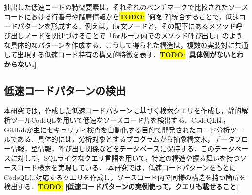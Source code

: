 \documentclass[submit,techrep,noauthor]{ipsj}
\newcommand{\todo}[1]{\colorbox{yellow}{{\bf TODO}:}{\color{red} {\textbf{[#1]}}}}
\begin{document}


抽出した低速コードの特徴要素は，それぞれのベンチマークで比較されたソースコードにおける行番号や階層情報から\todo{何を？}統合することで，低速コードパターンを形成する．例えば，for文ノードと，その配下にあるメソッド呼び出しノードを関連づけることで「forループ内でのメソッド呼び出し」のような具体的なパターンを作成する．こうして得られた構造は，複数の実装対に共通して出現する低速コード特有の構文的特徴を表す．\todo{具体例がないとわからない．}

\subsection{低速コードパターンの検出}

本研究では，作成した低速コードパターンに基づく検索クエリを作成し，静的解析ツールCodeQL\cite{ql}を用いて低速なソースコード片を検出する．CodeQLは，GitHubが主にセキュリティ検査を自動化する目的で開発されたコード分析ツールである．具体的には，分析対象とするプログラムから抽象構文木，データフロー情報，型情報，呼び出し関係などをデータベースに保持する．このデータベースに対して，SQLライクなクエリ言語を用いて，特定の構造や振る舞いを持つソースコード検索を実現している．
本研究では，低速コードパターンをもとにCodeQLに対応するクエリを作成し，ソースコード内で同様の構造を持つ箇所を検出する．\todo{低速コードパターンの実例使って，クエリも載せること}
\end{document}

